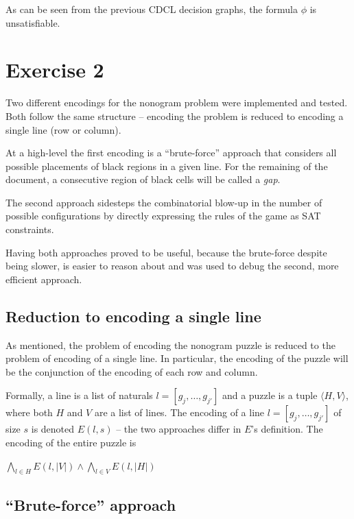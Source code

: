 \documentclass[12pt]{article}
\begin{document}
\vspace{1cm}

As can be seen from the previous CDCL decision graphs, the formula $\phi$ is unsatisfiable.

\section*{Exercise 2}

Two different encodings for the nonogram problem were implemented and tested.
Both follow the same structure -- encoding the problem is reduced to encoding a single line (row or column).

At a high-level the first encoding is a ``brute-force'' approach that considers all possible placements of black regions in a given line.
For the remaining of the document, a consecutive region of black cells will be called a \textit{gap}.

The second approach sidesteps the combinatorial blow-up in the number of possible configurations by directly expressing the rules of the game as SAT constraints.

Having both approaches proved to be useful, because the brute-force despite being slower, is easier to reason about and was used to debug the second, more efficient approach.

\subsection*{Reduction to encoding a single line}

As mentioned, the problem of encoding the nonogram puzzle is reduced to the problem of encoding of a single line.
In particular, the encoding of the puzzle will be the conjunction of the encoding of each row and column.

Formally, a line is a list of naturals $l = [g_j, \ldots, g_{j'}]$ and a puzzle is a tuple $\langle H, V\rangle$, where both $H$ and $V$ are a list of lines.
The encoding of a line $l = [g_j, \ldots, g_{j'}]$ of size $s$ is denoted $E(l, s)$ -- the two approaches differ in $E$'s definition.
The encoding of the entire puzzle is

\begin{center}
  $\bigwedge\limits_{l \in H} E(l, |V|) \wedge \bigwedge\limits_{l \in V} E(l, |H|)$
\end{center}


\subsection*{``Brute-force'' approach}
\end{document}

